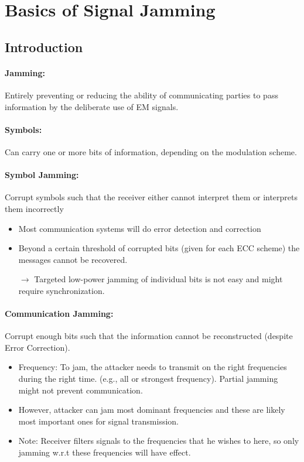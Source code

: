 \section{Basics of Signal Jamming}
\subsection{Introduction}

\paragraph{Jamming:} Entirely preventing or reducing the ability of communicating parties to pass information by the deliberate use of EM signals.

\paragraph{Symbols:} Can carry one or more bits of information, depending on the modulation scheme.

\paragraph{Symbol Jamming:} Corrupt symbols such that the receiver either cannot interpret them or interprets them incorrectly
\begin{itemize}
    \item Most communication systems will do error detection and
    correction
    \item Beyond a certain threshold of corrupted bits (given for each ECC scheme) the messages cannot be recovered.
    \item [$\rightarrow$] Targeted low-power jamming of individual bits is not easy and might require synchronization.
\end{itemize} 

\paragraph{Communication Jamming:} Corrupt enough bits such that the information cannot be reconstructed (despite Error Correction). 
\begin{itemize}
    \item Frequency: To jam, the attacker needs to transmit on the right
    frequencies during the right time. (e.g., all or strongest frequency). Partial jamming might not prevent communication.
    \item However, attacker can jam most dominant frequencies and these are likely most important ones for signal transmission. 
    \item Note: Receiver filters signals to the frequencies that he wishes to here, so only jamming w.r.t these frequencies will have effect. 
\end{itemize}

